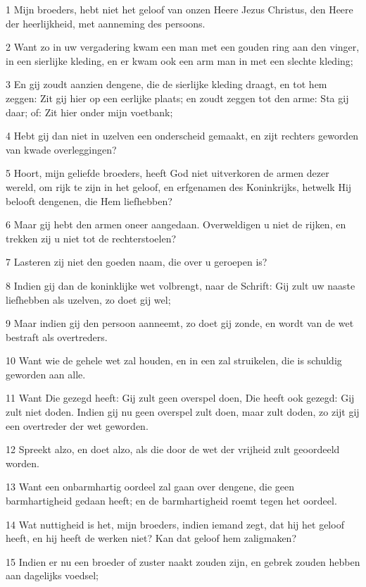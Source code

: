 \par 1 Mijn broeders, hebt niet het geloof van onzen Heere Jezus Christus, den Heere der heerlijkheid, met aanneming des persoons.
\par 2 Want zo in uw vergadering kwam een man met een gouden ring aan den vinger, in een sierlijke kleding, en er kwam ook een arm man in met een slechte kleding;
\par 3 En gij zoudt aanzien dengene, die de sierlijke kleding draagt, en tot hem zeggen: Zit gij hier op een eerlijke plaats; en zoudt zeggen tot den arme: Sta gij daar; of: Zit hier onder mijn voetbank;
\par 4 Hebt gij dan niet in uzelven een onderscheid gemaakt, en zijt rechters geworden van kwade overleggingen?
\par 5 Hoort, mijn geliefde broeders, heeft God niet uitverkoren de armen dezer wereld, om rijk te zijn in het geloof, en erfgenamen des Koninkrijks, hetwelk Hij belooft dengenen, die Hem liefhebben?
\par 6 Maar gij hebt den armen oneer aangedaan. Overweldigen u niet de rijken, en trekken zij u niet tot de rechterstoelen?
\par 7 Lasteren zij niet den goeden naam, die over u geroepen is?
\par 8 Indien gij dan de koninklijke wet volbrengt, naar de Schrift: Gij zult uw naaste liefhebben als uzelven, zo doet gij wel;
\par 9 Maar indien gij den persoon aanneemt, zo doet gij zonde, en wordt van de wet bestraft als overtreders.
\par 10 Want wie de gehele wet zal houden, en in een zal struikelen, die is schuldig geworden aan alle.
\par 11 Want Die gezegd heeft: Gij zult geen overspel doen, Die heeft ook gezegd: Gij zult niet doden. Indien gij nu geen overspel zult doen, maar zult doden, zo zijt gij een overtreder der wet geworden.
\par 12 Spreekt alzo, en doet alzo, als die door de wet der vrijheid zult geoordeeld worden.
\par 13 Want een onbarmhartig oordeel zal gaan over dengene, die geen barmhartigheid gedaan heeft; en de barmhartigheid roemt tegen het oordeel.
\par 14 Wat nuttigheid is het, mijn broeders, indien iemand zegt, dat hij het geloof heeft, en hij heeft de werken niet? Kan dat geloof hem zaligmaken?
\par 15 Indien er nu een broeder of zuster naakt zouden zijn, en gebrek zouden hebben aan dagelijks voedsel;

